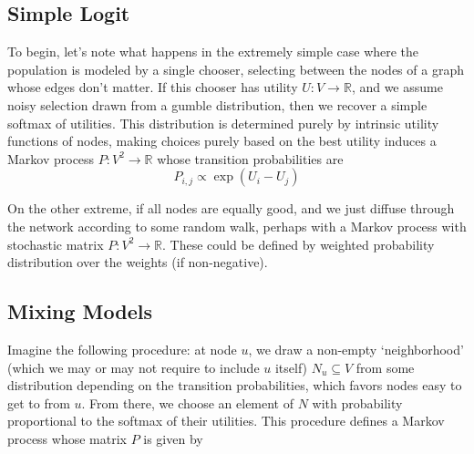\documentclass{article}
\theoremstyle{definition}
\begin{document}
	\subsection{Simple Logit}
	To begin, let's note what happens in the extremely simple case where the population is modeled by a single chooser, selecting between the nodes of a graph whose edges don't matter. If this chooser has utility $U : V \to \mathbb R$, and we assume noisy selection drawn from a gumble distribution, then we recover a simple softmax of utilities. This distribution is determined purely by intrinsic utility functions of nodes, making choices purely based on the best utility induces a Markov process $P : V^2 \to \mathbb R$ whose transition probabilities are	
	\[ P_{i,j} \propto \exp (U_i - U_j) \]%
	
	On the other extreme, if all nodes are equally good, and we just diffuse through the network according to some random walk, perhaps with a Markov process with stochastic matrix $P : V^2 \to \mathbb R$. These could be defined by weighted probability distribution over the weights (if non-negative).
	
	\subsection{Mixing Models}
%	
%	
%	
%	
%	
	Imagine the following procedure: at node $u$, we draw a non-empty `neighborhood' (which we may or may not require to include $u$ itself) $N_u \subseteq V$ from some distribution depending on the transition probabilities, which favors nodes easy to get to from $u$. From there, we choose an element of $N$ with probability proportional to the softmax of their utilities. This procedure defines a Markov process whose matrix $P$ is given by
	
\end{document}
